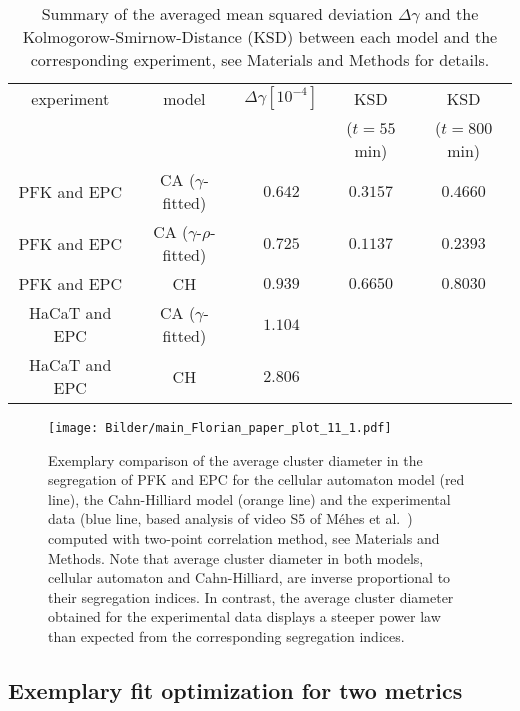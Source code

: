 \documentclass[10pt,letterpaper]{article}
\begin{document}
\begin{table}
  \begin{tabular}[ht!]{c|c|c|c|c}
    experiment & model & $\Delta\gamma[10^{-4}]$ & KSD & KSD \\
    & & & ($t=55$min) & ($t=800$min)\\
    \hline
    PFK and EPC & CA ($\gamma$-fitted) & $0.642$ & $0.3157$ & $0.4660$ \\
    PFK and EPC & CA ($\gamma$-$\rho$-fitted) & $0.725$ & $0.1137$ & $0.2393$\\
    PFK and EPC & CH & $0.939$ & $0.6650$ & $0.8030$\\
    HaCaT and EPC & CA ($\gamma$-fitted) & $1.104$ &  &  \\
    HaCaT and EPC & CH & $2.806$ &  & \\
  \end{tabular}
  \caption{Summary of the averaged mean squared deviation $\Delta\gamma$ and the
  Kolmogorow-Smirnow-Distance (KSD) between each model and the
  corresponding experiment, see Materials and Methods for details.}
  \label{tab:goodness_of_fit}
\end{table}

\begin{figure}[ht!]
 \centering
 \texttt{[image: Bilder/main\_Florian\_paper\_plot\_11\_1.pdf]}
 \caption{Exemplary comparison of the average cluster diameter in the
   segregation of PFK and EPC for the cellular automaton model (red
   line), the Cahn-Hilliard model (orange line) and the experimental
   data (blue line, based analysis of video S5 of Méhes et
   al.~\cite{MehMonNemVic2012}) computed with two-point correlation
   method, see Materials and Methods. Note that average cluster
   diameter in both models, cellular automaton and Cahn-Hilliard, are
   inverse proportional to their segregation indices. In contrast, the
   average cluster diameter obtained for the experimental data
   displays a steeper power law than expected from the corresponding
   segregation indices.}
 \label{fig:main_Florian_paper_plot_11_1}
\end{figure}



\subsection*{Exemplary fit optimization for two metrics}
\end{document}
